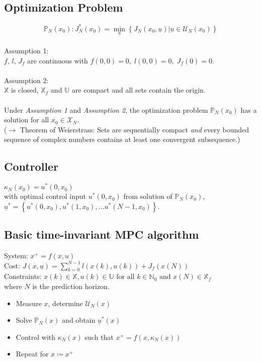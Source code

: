 \documentclass[english]{latex4ei/latex4ei_sheet}
\begin{document}
\begin{sectionbox}
\end{sectionbox}
\begin{sectionbox}

\subsection{Optimization Problem}
$$
\mathbb{P}_{N}\left(x_{0}\right): J_{N}^{*}\left(x_{0}\right)=\min _{\underline{u}}\left\{J_{N}\left(x_{0}, \underline{u}\right) | \underline{u} \in \mathcal{U}_{N}\left(x_{0}\right)\right\}
$$
\\
Assumption 1:\\
$f,\,l,\,J_f$ are continuous with $f(0,0)=0,\; l(0,0)=0,\; J_f(0)=0$.\\
\\
Assumption 2:\\
$\mathbb{X}$ is closed, $\mathbb{X}_f$ and $\mathbb{U}$ are compact and all sets contain the origin.\\
\\
Under \textit{Assumption 1} and \textit{Assumption 2}, the optimization problem $\mathbb{P}_N(x_0)$ has a solution for all $x_0\in\mathcal{X}_N$. \\($\rightarrow$ Theorem of Weierstrass: Sets are sequentially compact \textit{and} every bounded sequence of complex numbers contains at least one convergent subsequence.)\\

\subsection{Controller}
$\kappa_{N}\left(x_{0}\right)=u^{*}\left(0, x_{0}\right)$ \\ 
with optimal control input $u^{*}\left(0, x_{0}\right)$ from solution of $\mathbb{P}_{N}\left(x_{0}\right)$, \\$\underline{u}^{*}=\left\{u^{*}\left(0, x_{0}\right), u^{*}\left(1, x_{0}\right), \ldots u^{*}\left(N-1, x_{0}\right)\right\}$.\\

\subsection{Basic time-invariant MPC algorithm}
System: $x^{+}=f(x, u)$\\ 
Cost: $J(x, \underline{u})=\sum\limits_{k=0}^{N-1} l(x(k), u(k))+J_{f}(x(N))$ \\
Constraints: $x(k) \in \mathbb{X}, u(k) \in \mathbb{U} \text { for all } k \in \mathbb{N}_{0} \text { and } x(N) \in \mathbb{X}_{f}$ \\
where $N$ is the prediction horizon.
\begin{itemize}
    \item Measure $x$, determine $\mathcal{U}_N(x)$
    \item Solve $\mathbb{P}_N(x)$ and obtain $\underline{u}^*(x)$
    \item Control with $\kappa_N(x)$ such that $x^+=f(x,\kappa_N(x))$
    \item Repeat for $x\coloneqq x^+$
\end{itemize}\vspace{0.2cm}


\end{sectionbox}
\end{document}
